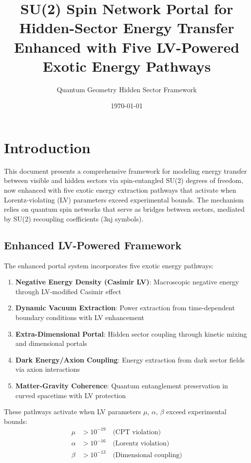 \documentclass{article}
\title{SU(2) Spin Network Portal for Hidden-Sector Energy Transfer\\
Enhanced with Five LV-Powered Exotic Energy Pathways}
\author{Quantum Geometry Hidden Sector Framework}
\date{\today}
\begin{document}
\maketitle

\section{Introduction}

This document presents a comprehensive framework for modeling energy transfer between visible and hidden sectors via spin-entangled SU(2) degrees of freedom, now enhanced with five exotic energy extraction pathways that activate when Lorentz-violating (LV) parameters exceed experimental bounds. The mechanism relies on quantum spin networks that serve as bridges between sectors, mediated by SU(2) recoupling coefficients (3nj symbols).

\subsection{Enhanced LV-Powered Framework}

The enhanced portal system incorporates five exotic energy pathways:

\begin{enumerate}
\item \textbf{Negative Energy Density (Casimir LV)}: Macroscopic negative energy through LV-modified Casimir effect
\item \textbf{Dynamic Vacuum Extraction}: Power extraction from time-dependent boundary conditions with LV enhancement
\item \textbf{Extra-Dimensional Portal}: Hidden sector coupling through kinetic mixing and dimensional portals
\item \textbf{Dark Energy/Axion Coupling}: Energy extraction from dark sector fields via axion interactions
\item \textbf{Matter-Gravity Coherence}: Quantum entanglement preservation in curved spacetime with LV protection
\end{enumerate}

These pathways activate when LV parameters $\mu$, $\alpha$, $\beta$ exceed experimental bounds:
\begin{align}
\mu &> 10^{-19} \quad \text{(CPT violation)} \\
\alpha &> 10^{-16} \quad \text{(Lorentz violation)} \\
\beta &> 10^{-13} \quad \text{(Dimensional coupling)}
\end{align}
\end{document}
